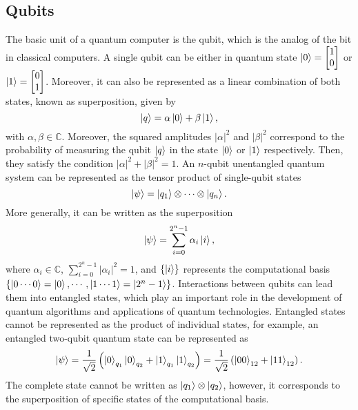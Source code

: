 \documentclass[10pt]{article}
\begin{document}
	\subsection{\label{app: qubits}Qubits}
	
	The basic unit of a quantum computer is the qubit, which is the analog of the bit in classical computers. A single qubit can be either in quantum state $\ket{0}=\begin{bmatrix}
		1 \\0
	\end{bmatrix}$ or $\ket{1}=\begin{bmatrix}
		0 \\1
	\end{bmatrix}$. Moreover, it can also be represented as a linear combination of both states, known as superposition, given by \citep{Nielsen2011QuantumComputing}
	\begin{equation}
		\ket{q}=\alpha\ket{0}+\beta\ket{1},
	\end{equation}
	with $\alpha,\beta \in \mathbb{C}$. Moreover, the squared amplitudes $|\alpha|^{2}$ and $|\beta|^{2}$ correspond to the probability of measuring the qubit $\ket{q}$ in the state $\ket{0}$ or $\ket{1}$ respectively. Then, they satisfy the condition $|\alpha|^{2}+|\beta|^{2}=1$.
	An $n$-qubit unentangled quantum system can be represented as the tensor product of single-qubit states
	\begin{equation}
		\ket{\psi}=\ket{q_{1}}\otimes \cdots \otimes \ket{q_{n}}.
	\end{equation}
	More generally, it can be written as the superposition
	\begin{equation}
		\ket{\psi}=\sum_{i=0}^{2^{n}-1}\alpha_{i}\ket{i},
	\end{equation}
	where $\alpha_{i}\in \mathbb{C}$, $\sum_{i=0}^{2^{n}-1}|\alpha_{i}|^{2}=1$, and $\{\ket{i}\}$ represents the computational basis $\{\ket{0\cdots 0}=\ket{0},\cdots,\ket{1\cdots 1}=\ket{2^{n}-1}\}$.
	Interactions between qubits can lead them into entangled states, which play an important role in the development of quantum algorithms and applications of quantum technologies. Entangled states cannot be represented as the product of individual states, for example, an entangled two-qubit quantum state can be represented as 
	\begin{equation}
		\ket{\psi} = \frac{1}{\sqrt{2}}\left(\ket{0}_{q_1}\ket{0}_{q_2} + \ket{1}_{q_1}\ket{1}_{q_2} \right) = \frac{1}{\sqrt{2}}\left(\ket{00}_{12} + \ket{11}_{12}\right).
	\end{equation}
	The complete state cannot be written as $\ket{q_1}\otimes\ket{q_2}$, however, it corresponds to the superposition of specific states of the computational basis.
	
\end{document}

